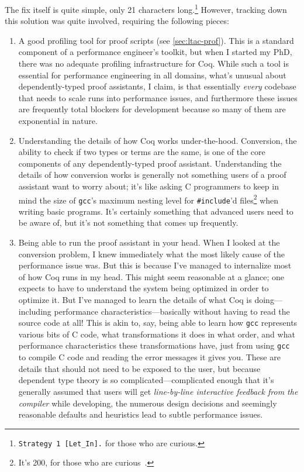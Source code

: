 The fix itself is quite simple, only 21 characters long.\footnote{\texttt{Strategy 1 [Let\_In].} for those who are curious.}
However, tracking down this solution was quite involved, requiring the following pieces:
\begin{enumerate}
  \item
    A good profiling tool for proof scripts (see \autoref{sec:ltac-prof}).
    This is a standard component of a performance engineer's toolkit, but when I started my PhD, there was no adequate profiling infrastructure for Coq.
    While such a tool is essential for performance engineering in all domains, what's unusual about dependently-typed proof assistants, I claim, is that essentially \emph{every} codebase that needs to scale runs into performance issues, and furthermore these issues are frequently total blockers for development because so many of them are exponential in nature.
  \item
    Understanding the details of how Coq works under-the-hood.
    Conversion, the ability to check if two types or terms are the same, is one of the core components of any dependently-typed proof assistant.
    Understanding the details of how conversion works is generally not something users of a proof assistant want to worry about; it's like asking C programmers to keep in mind the size of \texttt{gcc}'s maximum nesting level for \texttt{\#include}'d files\footnote{It's 200, for those who are curious~\cite{C2017FSF}.} when writing basic programs.
    It's certainly something that advanced users need to be aware of, but it's not something that comes up frequently.
  \item
    Being able to run the proof assistant in your head.
    When I looked at the conversion problem, I knew immediately what the most likely cause of the performance issue was.
    But this is because I've managed to internalize most of how Coq runs in my head.
    This might seem reasonable at a glance; one expects to have to understand the system being optimized in order to optimize it.
    But I've managed to learn the details of what Coq is doing---including performance characteristics---basically without having to read the source code at all!
    This is akin to, say, being able to learn how \texttt{gcc} represents various bits of C code, what transformations it does in what order, and what performance characteristics these transformations have, just from using \texttt{gcc} to compile C code and reading the error messages it gives you.
    These are details that should not need to be exposed to the user, but because dependent type theory is so complicated---complicated enough that it's generally assumed that users will get \emph{line-by-line interactive feedback from the compiler} while developing, the numerous design decisions and seemingly reasonable defaults and heuristics lead to subtle performance issues.

\end{enumerate}

